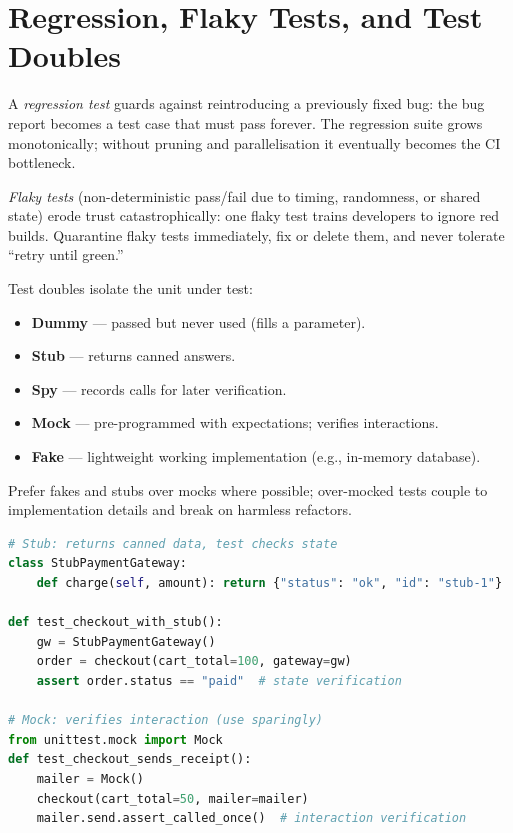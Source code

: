 \section{Regression, Flaky Tests, and Test Doubles}

A \emph{regression test} guards against reintroducing a previously fixed bug: the bug report becomes a test case that must pass forever. The regression suite grows monotonically; without pruning and parallelisation it eventually becomes the CI bottleneck.

\emph{Flaky tests} (non-deterministic pass/fail due to timing, randomness, or shared state) erode trust catastrophically: one flaky test trains developers to ignore red builds. Quarantine flaky tests immediately, fix or delete them, and never tolerate ``retry until green.''

Test doubles isolate the unit under test:

\begin{itemize}
    \item \textbf{Dummy} --- passed but never used (fills a parameter).
    \item \textbf{Stub} --- returns canned answers.
    \item \textbf{Spy} --- records calls for later verification.
    \item \textbf{Mock} --- pre-programmed with expectations; verifies interactions.
    \item \textbf{Fake} --- lightweight working implementation (e.g., in-memory database).
\end{itemize}

Prefer fakes and stubs over mocks where possible; over-mocked tests couple to implementation details and break on harmless refactors.

\begin{lstlisting}[language=Python,caption={Stub vs.\ mock -- prefer stubs for state verification.}]
# Stub: returns canned data, test checks state
class StubPaymentGateway:
    def charge(self, amount): return {"status": "ok", "id": "stub-1"}

def test_checkout_with_stub():
    gw = StubPaymentGateway()
    order = checkout(cart_total=100, gateway=gw)
    assert order.status == "paid"  # state verification

# Mock: verifies interaction (use sparingly)
from unittest.mock import Mock
def test_checkout_sends_receipt():
    mailer = Mock()
    checkout(cart_total=50, mailer=mailer)
    mailer.send.assert_called_once()  # interaction verification
\end{lstlisting}

